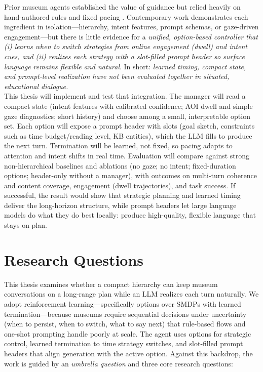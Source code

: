 \documentclass[12pt]{article}
\begin{document}
Prior museum agents established the value of guidance but relied heavily on hand-authored rules and fixed pacing \citep{kopp2005conversational,traum2012ada}. Contemporary work demonstrates each ingredient in isolation—hierarchy, intent features, prompt schemas, or gaze-driven engagement—but there is little evidence for a \emph{unified, option-based controller that (i) learns when to switch strategies from online engagement (dwell) and intent cues, and (ii) realizes each strategy with a slot-filled prompt header so surface language remains flexible and natural}. In short: \emph{learned timing, compact state, and prompt-level realization have not been evaluated together in situated, educational dialogue.}\\

This thesis will implement and test that integration. The manager will read a compact state (intent features with calibrated confidence; AOI dwell and simple gaze diagnostics; short history) and choose among a small, interpretable option set. Each option will expose a prompt header with slots (goal sketch, constraints such as time budget/reading level, KB entities), which the LLM fills to produce the next turn. Termination will be learned, not fixed, so pacing adapts to attention and intent shifts in real time. Evaluation will compare against strong non-hierarchical baselines and ablations (no gaze; no intent; fixed-duration options; header-only without a manager), with outcomes on multi-turn coherence and content coverage, engagement (dwell trajectories), and task success. If successful, the result would show that strategic planning and learned timing deliver the long-horizon structure, while prompt headers let large language models do what they do best locally: produce high-quality, flexible language that stays on plan.

\section{Research Questions}
\label{sec:research-questions}

This thesis examines whether a compact hierarchy can keep museum conversations on a long-range plan while an LLM realizes each turn naturally. We adopt reinforcement learning—specifically options over SMDPs with learned termination—because museums require sequential decisions under uncertainty (when to persist, when to switch, what to say next) that rule-based flows and one-shot prompting handle poorly at scale. The agent uses options for strategic control, learned termination to time strategy switches, and slot-filled prompt headers that align generation with the active option. Against this backdrop, the work is guided by an \emph{umbrella question} and three core research questions:\\
\end{document}
